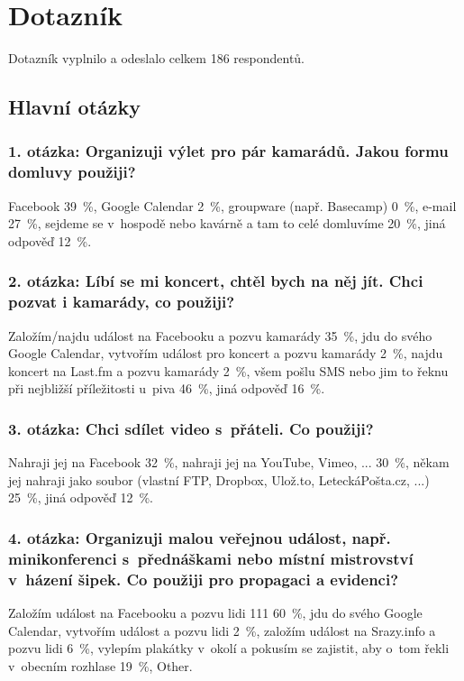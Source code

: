 \documentclass[12pt,oneside,final]{fithesis2}
\begin{document}
\chapter{Dotazník}\label{pollAppendix}
Dotazník vyplnilo a odeslalo celkem 186 respondentů.

\section{Hlavní otázky}

\subsection*{1. otázka: Organizuji výlet pro pár kamarádů. Jakou formu domluvy použiji?}
Facebook 39~\%,
Google Calendar 2~\%,
groupware (např. Basecamp) 0~\%,
e-mail 27~\%,
sejdeme se v~hospodě nebo kavárně a tam to celé domluvíme 20~\%,
jiná odpověď 12~\%.

\subsection*{2. otázka: Líbí se mi koncert, chtěl bych na něj jít. Chci pozvat i kamarády, co použiji?}
Založím/najdu událost na Facebooku a pozvu kamarády 35~\%,
jdu do svého Google Calendar, vytvořím událost pro koncert a pozvu kamarády  2~\%,
najdu koncert na Last.fm a pozvu kamarády  2~\%,
všem pošlu SMS nebo jim to řeknu při nejbližší příležitosti u~piva 46~\%,
jiná odpověď 16~\%.

\subsection*{3. otázka: Chci sdílet video s~přáteli. Co použiji?}
Nahraji jej na Facebook 32~\%,
nahraji jej na YouTube, Vimeo, ... 30~\%,
někam jej nahraji jako soubor (vlastní FTP, Dropbox, Ulož.to, LeteckáPošta.cz, ...) 25~\%,
jiná odpověď 12~\%.

\subsection*{4. otázka: Organizuji malou veřejnou událost, např. minikonferenci s~přednáškami nebo místní mistrovství v~házení šipek. Co použiji pro propagaci a evidenci?}
Založím událost na Facebooku a pozvu lidi 111 60~\%,
jdu do svého Google Calendar, vytvořím událost a pozvu lidi 2~\%,
založím událost na Srazy.info a pozvu lidi 6~\%,
vylepím plakátky v~okolí a pokusím se zajistit, aby o~tom řekli v~obecním rozhlase 19~\%,
Other.
\end{document}
